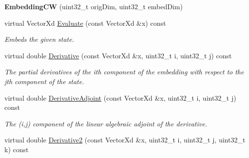 \begin{DoxyCompactItemize}
\item 
\hypertarget{struct_d_r_d_s_p_1_1_embedding_c_w_a36beb21857003df4f283dd1f0459b178}{{\bfseries Embedding\-C\-W} (uint32\-\_\-t orig\-Dim, uint32\-\_\-t embed\-Dim)}\label{struct_d_r_d_s_p_1_1_embedding_c_w_a36beb21857003df4f283dd1f0459b178}

\item 
\hypertarget{struct_d_r_d_s_p_1_1_embedding_c_w_a630cb32ea4cf52cc278c89322a944257}{virtual Vector\-Xd \hyperlink{struct_d_r_d_s_p_1_1_embedding_c_w_a630cb32ea4cf52cc278c89322a944257}{Evaluate} (const Vector\-Xd \&x) const }\label{struct_d_r_d_s_p_1_1_embedding_c_w_a630cb32ea4cf52cc278c89322a944257}

\begin{DoxyCompactList}\small\item\em Embeds the given state. \end{DoxyCompactList}\item 
\hypertarget{struct_d_r_d_s_p_1_1_embedding_c_w_ae7e3c46b785e7b023119238a0d8cc0db}{virtual double \hyperlink{struct_d_r_d_s_p_1_1_embedding_c_w_ae7e3c46b785e7b023119238a0d8cc0db}{Derivative} (const Vector\-Xd \&x, uint32\-\_\-t i, uint32\-\_\-t j) const }\label{struct_d_r_d_s_p_1_1_embedding_c_w_ae7e3c46b785e7b023119238a0d8cc0db}

\begin{DoxyCompactList}\small\item\em The partial derivatives of the ith component of the embedding with respect to the jth component of the state. \end{DoxyCompactList}\item 
\hypertarget{struct_d_r_d_s_p_1_1_embedding_c_w_a0350d8d148c7816ae8b2ee27bf4f54cd}{virtual double \hyperlink{struct_d_r_d_s_p_1_1_embedding_c_w_a0350d8d148c7816ae8b2ee27bf4f54cd}{Derivative\-Adjoint} (const Vector\-Xd \&x, uint32\-\_\-t i, uint32\-\_\-t j) const }\label{struct_d_r_d_s_p_1_1_embedding_c_w_a0350d8d148c7816ae8b2ee27bf4f54cd}

\begin{DoxyCompactList}\small\item\em The (i,j) component of the linear algebraic adjoint of the derivative. \end{DoxyCompactList}\item 
\hypertarget{struct_d_r_d_s_p_1_1_embedding_c_w_a98b06fcd2b37246b967ff2660be15568}{virtual double \hyperlink{struct_d_r_d_s_p_1_1_embedding_c_w_a98b06fcd2b37246b967ff2660be15568}{Derivative2} (const Vector\-Xd \&x, uint32\-\_\-t i, uint32\-\_\-t j, uint32\-\_\-t k) const }\label{struct_d_r_d_s_p_1_1_embedding_c_w_a98b06fcd2b37246b967ff2660be15568}


\end{DoxyCompactItemize}
